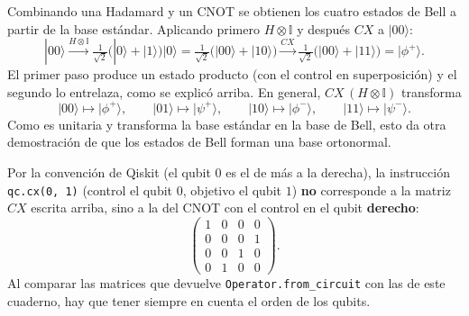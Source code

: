 \documentclass[11pt, a4paper, twoside, openright]{report}
\begin{document}
\begin{tcolorbox}[colback=cyan!5!white,colframe=cyan!75!black,title=\textbf{Ejemplo: Cómo se fabrican los estados de Bell}]
Combinando una Hadamard y un CNOT se obtienen los cuatro estados de Bell a partir de la base estándar. Aplicando primero $H\otimes\mathbb{I}$ y después $CX$ a $|00\rangle$:
\[
|00\rangle \xrightarrow{H\otimes\mathbb{I}} \tfrac{1}{\sqrt2}\big(|0\rangle + |1\rangle\big)|0\rangle = \tfrac{1}{\sqrt2}\big(|00\rangle + |10\rangle\big) \xrightarrow{CX} \tfrac{1}{\sqrt2}\big(|00\rangle + |11\rangle\big) = |\phi^+\rangle.
\]
El primer paso produce un estado producto (con el control en superposición) y el segundo lo entrelaza, como se explicó arriba. En general, $CX\,(H\otimes\mathbb{I})$ transforma
\[ |00\rangle\mapsto|\phi^+\rangle, \qquad |01\rangle\mapsto|\psi^+\rangle, \qquad |10\rangle\mapsto|\phi^-\rangle, \qquad |11\rangle\mapsto|\psi^-\rangle. \]
Como es unitaria y transforma la base estándar en la base de Bell, esto da otra demostración de que los estados de Bell forman una base ortonormal.
\end{tcolorbox}

\begin{tcolorbox}[colback=blue!5!white,colframe=blue!75!black,title=\textbf{Nota Aclaratoria: Operaciones controladas en Qiskit}]
Por la convención de Qiskit (el qubit $0$ es el de más a la derecha), la instrucción \texttt{qc.cx(0, 1)} (control el qubit $0$, objetivo el qubit $1$) \textbf{no} corresponde a la matriz $CX$ escrita arriba, sino a la del CNOT con el control en el qubit \textbf{derecho}:
\[ \begin{pmatrix} 1&0&0&0\\0&0&0&1\\0&0&1&0\\0&1&0&0\end{pmatrix}. \]
Al comparar las matrices que devuelve \texttt{Operator.from\_circuit} con las de este cuaderno, hay que tener siempre en cuenta el orden de los qubits.
\end{tcolorbox}
\end{document}
